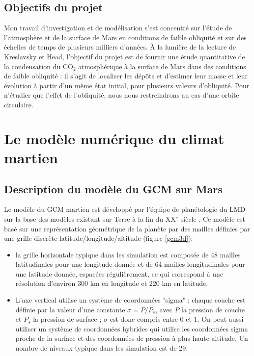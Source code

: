 \documentclass[11pt,a4paper]{article}
\begin{document}
\subsection{Objectifs du projet} 
Mon travail d'investigation et de modélisation s'est concentré sur l'étude de l'atmosphère et de la surface de Mars en conditions de faible obliquité et sur des échelles de temps de plusieurs milliers d'années. À la lumière de la lecture de Kreslavsky et Head, l'objectif du projet est de fournir une étude quantitative de la condensation du  CO$_2$ atmosphérique à la surface de Mars dans des conditions de faible obliquité : il s'agit de localiser les dépôts et d'estimer leur masse et leur évolution à partir d'un même état initial, pour plusieurs valeurs d'obliquité. Pour n'étudier que l'effet de l'obliquité, nous nous restreindrons au cas d'une orbite circulaire. 


\clearpage
\section{Le modèle numérique du climat martien}
\subsection{Description du modèle du GCM sur Mars }
\label{gcm}
Le modèle du GCM martien est développé par l'équipe de planétologie du LMD sur la base des modèles existant sur Terre à la fin du XX$^e$ siècle \citep{Forg:99}. Ce modèle est basé sur une représentation géométrique de la planète par des mailles définies par une grille discrète latitude/longitude/altitude (figure \ref{gcm3d}): 
\begin{itemize}
\item la grille horizontale typique dans les simulation est composée de 48 mailles latitudinales pour une longitude donnée et de 64 mailles longitudinales pour une latitude donnée, espacées régulièrement, ce qui correspond à une résolution d'environ 300 km en longitude et 220 km en latitude. 
\item L'axe vertical utilise un système de coordonnées "sigma" : chaque couche est définie par la valeur d'une constante $\sigma = P / P_s$, avec $P$ la pression de couche et $P_s$ la pression de surface ; $\sigma$ est donc compris entre $0$ et $1$. On peut aussi utiliser un système de coordonnées hybrides qui utilise les coordonnées sigma proche de la surface et des coordonnées de pression à plus haute altitude. Un nombre de niveaux typique dans les simulation est de 29. \\
\end{itemize}
\end{document}
